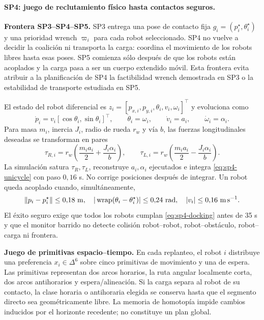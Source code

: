 \paragraph{SP4: juego de reclutamiento f\'isico hasta contactos seguros.}
\label{sec:resultados-sp4}

\medskip
\noindent\textbf{Frontera SP3--SP4--SP5.}
SP3 entrega una pose de contacto fija $g_i=(p_i^\star,\theta_i^\star)$ y una
prioridad wrench $\varpi_i$ para cada robot seleccionado. SP4 no vuelve a decidir
la coalici\'on ni transporta la carga: coordina el movimiento de los robots libres
hasta esas poses. SP5 comienza s\'olo despu\'es de que los robots est\'an acoplados y
la carga pasa a ser un cuerpo extendido m\'ovil. Esta frontera evita atribuir a la
planificaci\'on de SP4 la factibilidad wrench demostrada en SP3 o la estabilidad de
transporte estudiada en SP5.

El estado del robot diferencial es
$z_i=[p_{x,i},p_{y,i},\theta_i,v_i,\omega_i]^\top$ y evoluciona como
\begin{equation}
 \dot p_i=v_i[\cos\theta_i,\sin\theta_i]^\top,\qquad
 \dot\theta_i=\omega_i,\qquad
 \dot v_i=a_i,\qquad
 \dot\omega_i=\alpha_i .
 \label{eq:sp4-unicycle}
\end{equation}
Para masa $m_i$, inercia $J_i$, radio de rueda $r_w$ y v\'ia $b$, las fuerzas
longitudinales deseadas se transforman en pares
\begin{equation}
 \tau_{R,i}=r_w\left(\frac{m_i a_i}{2}+\frac{J_i\alpha_i}{b}\right),
 \qquad
 \tau_{L,i}=r_w\left(\frac{m_i a_i}{2}-\frac{J_i\alpha_i}{b}\right).
 \label{eq:sp4-wheel-torque}
\end{equation}
La simulaci\'on satura $\tau_R,\tau_L$, reconstruye $a_i,\alpha_i$ ejecutados e
integra \eqref{eq:sp4-unicycle} con paso $0{,}16$ s. No corrige posiciones despu\'es
de integrar. Un robot queda acoplado cuando, simult\'aneamente,
\begin{equation}
 \left\lVert p_i-p_i^\star\right\rVert\leq0{,}18\ {\rm m},\quad
 |\operatorname{wrap}(\theta_i-\theta_i^\star)|\leq0{,}24\ {\rm rad},\quad
 |v_i|\leq0{,}16\ {\rm m\,s^{-1}}.
 \label{eq:sp4-docking}
\end{equation}
El \'exito seguro exige que todos los robots cumplan \eqref{eq:sp4-docking} antes
de 35 s y que el monitor barrido no detecte colisi\'on robot--robot,
robot--obst\'aculo, robot--carga ni frontera.



\medskip
\noindent\textbf{Juego de primitivas espacio--tiempo.}
En cada replanteo, el robot $i$ distribuye una preferencia
$x_i\in\Delta^6$ sobre cinco primitivas de movimiento y una de espera. Las
primitivas representan dos arcos horarios, la ruta angular localmente corta, dos
arcos antihorarios y espera/alineaci\'on. Si la carga separa al robot de su contacto,
la clase horaria o antihoraria elegida se conserva hasta que el segmento directo
sea geom\'etricamente libre. La memoria de homotop\'ia impide cambios inducidos
por el horizonte recedente; no constituye un plan global.


